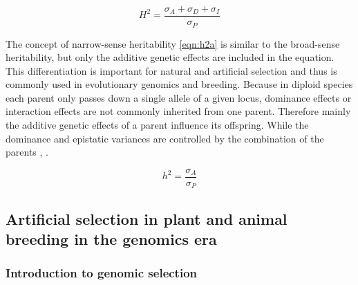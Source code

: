 \begin{equation}
 H^2 = \frac{\sigma_{A} + \sigma_{D} + \sigma_{I}}{\sigma_{P}}
 \label{eqn:h2G}
\end{equation}

The concept of narrow-sense heritability \ref{eqn:h2a} is similar to the broad-sense
heritability, but only the additive genetic effects are included in the equation. This
differentiation is important for natural and artificial selection and thus is commonly used
in evolutionary genomics and breeding. Because in diploid species each parent only passes
down a single allele of a given locus, dominance effects or interaction effects are
not commonly inherited from one parent. Therefore mainly the additive genetic effects of a
parent influence its offspring. While the dominance and epistatic variances are controlled
by the combination of the parents \cite{falconer1996}, \cite{walsh2018}.

\begin{equation}
  h^2 = \frac{\sigma_{A}}{\sigma_{P}}
 \label{eqn:h2a}
\end{equation}

\subsection{Artificial selection in plant and animal breeding in the genomics era}
\subsubsection{Introduction to genomic selection } \label{intro:gs}

